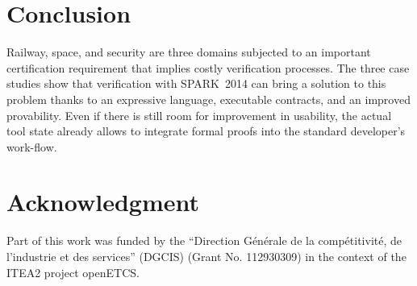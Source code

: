 \documentclass[10pt,a4paper,twocolumn]{article}
\newcommand{\openetcs}{openETCS\xspace}
\newcommand{\newspark}{SPARK~2014\xspace}
\begin{document}
\section{Conclusion}

Railway, space, and security are three domains subjected to an important
certification requirement that implies costly verification processes. The three
case studies show that verification with \newspark can bring a solution to this
problem thanks to an expressive language, executable contracts, and
an improved provability. Even if there is still room for improvement in
usability, the actual tool state already allows to integrate formal proofs into
the standard developer's work-flow.

\section{Acknowledgment}

Part of this work was funded by the ``Direction Générale de la
compétitivité, de l'industrie et des services'' (DGCIS) (Grant
No. 112930309) in the context of the ITEA2 project \openetcs.



\end{document}
